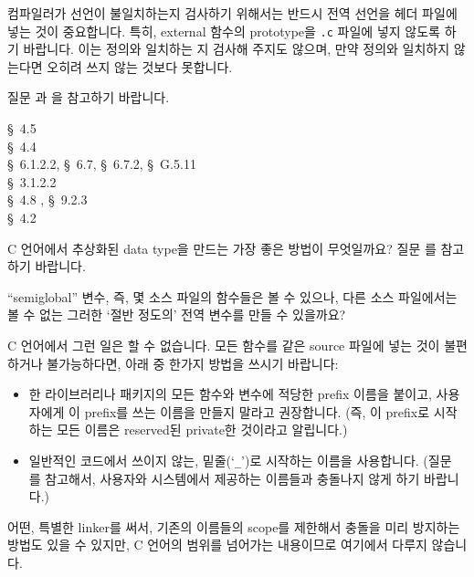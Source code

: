 \begin{faq}
	컴파일러가 선언이 불일치하는지 검사하기 위해서는 반드시 전역 선언을
	헤더 파일에 넣는 것이 중요합니다.  특히, external 함수의 
	prototype을 \verb+.c+ 파일에 넣지 않도록 하기 바랍니다.
	이는 정의와 일치하는 지 검사해 주지도 않으며, 만약 정의와 일치하지
	않는다면 오히려 쓰지 않는 것보다 못합니다.

	질문 과 을 참고하기 바랍니다.

\R
	\cite{kr1} \S\ 4.5  \\
	\cite{kr2} \S\ 4.4  \\
	\cite{c89} \S\ 6.1.2.2, \S\ 6.7, \S\ 6.7.2, \S\ G.5.11 \\
	\cite{rationale} \S\ 3.1.2.2 \\
	\cite{hs} \S\ 4.8 , \S\ 9.2.3  \\
	\cite{ctp} \S\ 4.2 
\end{faq}

\begin{faq}
	C 언어에서 추상화된 data type을 만드는 가장 좋은 방법이 무엇일까요?
\A
	질문 를 참고하기 바랍니다.
\end{faq}

\begin{faq}
	``semiglobal'' 변수, 즉, 몇 소스 파일의 함수들은 볼 수 있으나,
	다른 소스 파일에서는 볼 수 없는 그러한 `절반 정도의' 전역 변수를
	만들 수 있을까요?


\A
	C 언어에서 그런 일은 할 수 없습니다.
	모든 함수를 같은 source 파일에 넣는 것이 불편하거나 불가능하다면,
	아래 중 한가지 방법을 쓰시기 바랍니다:

        \begin{itemize}
        \item 한 라이브러리나 패키지의 모든 함수와 변수에 적당한 prefix 이름을 
	  붙이고, 사용자에게 이 prefix를 쓰는 이름을 만들지 말라고 권장합니다.
          (즉, 이 prefix로 시작하는 모든 이름은 reserved된 private한 것이라고
          알립니다.)
        \item 일반적인 코드에서 쓰이지 않는, 밑줄(`\verb+_+')로 시작하는
          이름을 사용합니다. (질문 를 참고해서, 사용자와 시스템에서
          제공하는 이름들과 충돌나지 않게 하기 바랍니다.)
        \end{itemize}

        \noindent 어떤, 특별한 linker를 써서, 기존의 이름들의 scope를 제한해서
        충돌을 미리 방지하는 방법도 있을 수 있지만, C 언어의 범위를 넘어가는
        내용이므로 여기에서 다루지 않습니다.
\end{faq}

